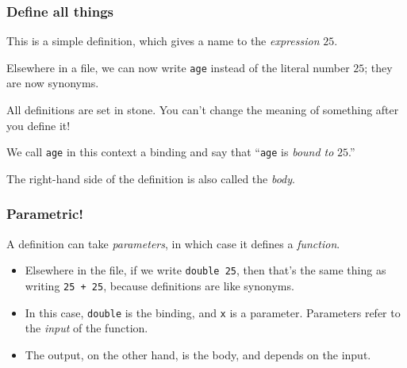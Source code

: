 \documentclass{beamer}
\begin{document}
\begin{frame}
  \frametitle{Define all things}

  This is a simple definition, which gives a name to the \emph{expression} $25$.

  Elsewhere in a file, we can now write \texttt{age} instead of the literal
  number $25$; they are now synonyms.

  \begin{figure}
    \centering
  \end{figure}

  \pause
  All definitions are set in stone. You can't change the meaning of something
  after you define it!

  We call \texttt{age} in this context a \alert{binding} and say that
  ``\texttt{age} is \emph{bound to} $25$.''

  The right-hand side of the definition is also called the \emph{body}.
\end{frame}

\begin{frame}
  \frametitle{Parametric!}

  A definition can take \emph{parameters}, in which case it defines a
  \emph{function}.


  \begin{figure}
    \centering
  \end{figure}

  \begin{itemize}
  \item
    Elsewhere in the file, if we write \texttt{double 25}, then that's the same
    thing as writing \texttt{25 + 25}, because definitions are like synonyms.
  \pause
  \item
    In this case, \texttt{double} is the binding, and \texttt{x} is a
    \alert{parameter}. Parameters refer to the \emph{input} of the function.

  \pause
  \item
    The output, on the other hand, is the body, and depends on the input.
  \end{itemize}
\end{frame}
\end{document}
